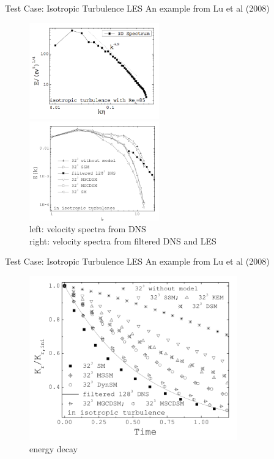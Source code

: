\begin{frame}{Test Case: Isotropic Turbulence LES}
An example from Lu et al (2008) 
\begin{figure}
\includegraphics[width=0.5\textwidth]{compare12}
\includegraphics[width=0.5\textwidth]{compare13}
~\\left: velocity spectra from DNS\\right: velocity spectra from filtered DNS and LES
\end{figure}
\end{frame}

\begin{frame}{Test Case: Isotropic Turbulence LES}
An example from Lu et al (2008) 
\begin{figure}
\includegraphics[width=0.8\textwidth]{compare14}
~\\energy decay
\end{figure}
\end{frame}

